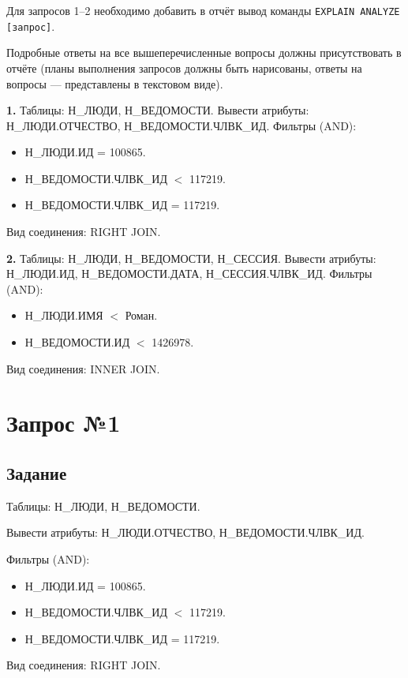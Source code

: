 \documentclass[12pt,a4paper]{article}
\begin{document}
Для запросов 1--2 необходимо добавить в отчёт вывод команды
\texttt{EXPLAIN ANALYZE [запрос]}.

Подробные ответы на все вышеперечисленные вопросы должны присутствовать в
отчёте (планы выполнения запросов должны быть нарисованы, ответы на вопросы
--- представлены в текстовом виде).

\bigskip
\textbf{1.}
Таблицы: Н\_ЛЮДИ, Н\_ВЕДОМОСТИ.
Вывести атрибуты: Н\_ЛЮДИ.ОТЧЕСТВО, Н\_ВЕДОМОСТИ.ЧЛВК\_ИД.
Фильтры (AND):
\begin{itemize}
  \item[a)] Н\_ЛЮДИ.ИД = 100865.
  \item[b)] Н\_ВЕДОМОСТИ.ЧЛВК\_ИД $<$ 117219.
  \item[c)] Н\_ВЕДОМОСТИ.ЧЛВК\_ИД = 117219.
\end{itemize}
Вид соединения: RIGHT JOIN.

\bigskip
\textbf{2.}
Таблицы: Н\_ЛЮДИ, Н\_ВЕДОМОСТИ, Н\_СЕССИЯ.
Вывести атрибуты: Н\_ЛЮДИ.ИД, Н\_ВЕДОМОСТИ.ДАТА, Н\_СЕССИЯ.ЧЛВК\_ИД.
Фильтры (AND):
\begin{itemize}
  \item[a)] Н\_ЛЮДИ.ИМЯ $<$ Роман.
  \item[b)] Н\_ВЕДОМОСТИ.ИД $<$ 1426978.
\end{itemize}
Вид соединения: INNER JOIN.

\newpage

\section{Запрос №1}

\subsection{Задание}

\hspace{\parindent}Таблицы: Н\_ЛЮДИ, Н\_ВЕДОМОСТИ.

Вывести атрибуты: Н\_ЛЮДИ.ОТЧЕСТВО, Н\_ВЕДОМОСТИ.ЧЛВК\_ИД.

Фильтры (AND):
\begin{itemize}
  \item[a)] Н\_ЛЮДИ.ИД = 100865.
  \item[b)] Н\_ВЕДОМОСТИ.ЧЛВК\_ИД $<$ 117219.
  \item[c)] Н\_ВЕДОМОСТИ.ЧЛВК\_ИД = 117219.
\end{itemize}
Вид соединения: RIGHT JOIN.
\end{document}
